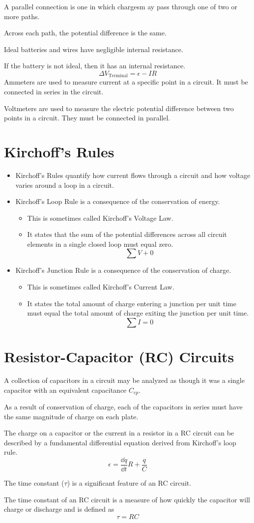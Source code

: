 \documentclass[../em.tex]{subfiles}
\begin{document}
A parallel connection is one in which chargesm ay pass through one of two or more paths.

Across each path, the potential difference is the same.

Ideal batteries and wires have negligible internal resistance.

If the battery is not ideal, then it has an internal resistance.
\[\Delta V_{\text{Terminal}}=\epsilon - IR \]
Ammeters are used to measure current at a specific point in a circuit. It must be connected in series in the circuit.

Voltmeters are used to measure the electric potential difference between two points in a circuit. They must be connected in parallel.
\section{Kirchoff's Rules}
\begin{itemize}
    \item Kirchoff's Rules quantify how current flows through a circuit and how voltage varies around a loop in a circuit.
    \item Kirchoff's Loop Rule is a consequence of the conservation of energy.
    \begin{itemize}
        \item This is sometimes called Kirchoff's Voltage Law.
        \item It states that the sum of the potential differences across all circuit elements in a single closed loop must equal zero.
        \[\sum V + 0\]
    \end{itemize}
    \item Kirchoff's Junction Rule is a consequence of the conservation of charge.
    \begin{itemize}
        \item This is sometimes called Kirchoff's Current Law.
        \item It states the total amount of charge entering a junction per unit time must equal the total amount of charge exiting the junction per unit time.
        \[\sum I = 0\]
    \end{itemize}
\end{itemize}

\section{Resistor-Capacitor (RC) Circuits}
A collection of capacitors in a circuit may be analyzed as though it was a single capacitor with an equivalent capacitance $C_{ep}$.

As a result of conservation of charge, each of the capacitors in series must have the same magnitude of charge on each plate.

The charge on a capacitor or the current in a resistor in a RC circuit can be described by a 
fundamental differential equation derived from Kirchoff's loop rule.
\[ \epsilon = \frac{\dd q}{\dd t}R+\frac{q}{C} \]

The time constant ($\tau$) is a significant feature of an RC circuit.

The time constant of an RC circuit is a measure of how quickly the capacitor will charge or discharge and is defined as 
\[\tau = RC\]
\end{document}
